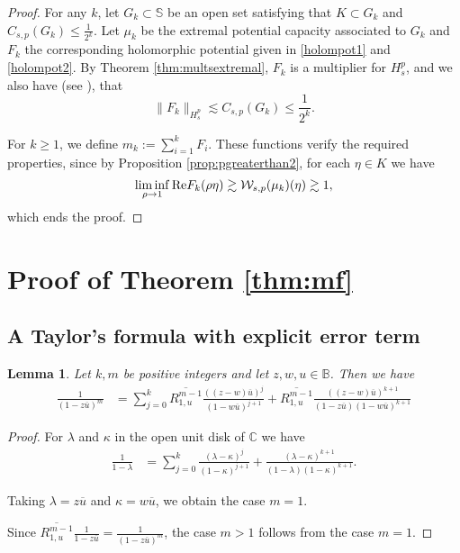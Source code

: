 \documentclass[12pt,twoside,leqno,final]{amsart}
\theoremstyle{plain}
\newtheorem{lem}[thm]{Lemma}
\begin{document}
\begin{proof}
For any $k$, let $G_k\subset {{\mathbb S}}$ be an open set satisfying that $K\subset G_k$ and $C_{s,p}(G_k)\leq \frac1{2^k}$.
Let $\mu_k$ be the extremal potential capacity associated to $G_k$ and $F_k$ the corresponding holomorphic potential given in \eqref{holompot1} and \eqref{holompot2}. By Theorem \ref{thm:multsextremal}, $F_k$ is a multiplier for $H_s^p$, and we also have (see \cite{aherncohn}), that  $$\|F_k\|_{H_s^p}\lesssim C_{s,p}(G_k)\leq \frac1{2^k}.$$

For $k\geq 1$, we define $m_k:= \sum_{i=1}^kF_i$. These functions verify the required properties, since by Proposition \ref{prop:pgreaterthan2}, for each $\eta \in K$ we have
$$\liminf_{\rho\rightarrow1}{\rm Re}F_k(\rho\eta)\gtrsim {\mathcal W}_{s,p}(\mu_k)(\eta)\gtrsim 1,$$
which ends the proof.
\end{proof}

\section{Proof of Theorem \ref{thm:mf}} \label{sec:mf}

\subsection{A Taylor's formula with explicit error term}

\begin{lem} \label{lem:TaylorKernel}
Let $k,m$ be positive integers and let $z,w,u\in {{\mathbb B}}$. Then we have
\begin{align*}
\frac{1}{(1-z\overline u)^{m}}&
=\sum_{j=0}^k \overline{R^{m-1}_{1,u}}\frac {((z-w)\overline u)^{j}}{(1-w\overline u)^{j+1}} 
+\overline{R^{m-1}_{1,u}}\frac{((z-w)\overline u)^{k+1}}{(1-z\overline u)(1-w\overline u)^{k+1}}
\end{align*}
\end{lem} 

\begin{proof}  For $\lambda$ and $\kappa$  in the open unit disk of ${{\mathbb C}}$ we have
\begin{align*}
\frac{1}{1-\lambda}
&=\sum_{j=0}^k \frac {(\lambda-\kappa)^{j}}{(1-\kappa)^{j+1}} +\frac{(\lambda-\kappa)^{k+1}}{(1-\lambda)(1-\kappa)^{k+1}}.
\end{align*}

Taking $\lambda=z\overline u$ and $\kappa=w\overline u$, we obtain the case $m=1$.

Since 
$\displaystyle{ \overline{R^{m-1}_{1,u}}\frac{1}{1-z\overline u}=\frac{1}{(1-z\overline u)^{m}}}$, 
the case $m>1$ follows from the case $m=1$.
\end{proof}
\end{document}
